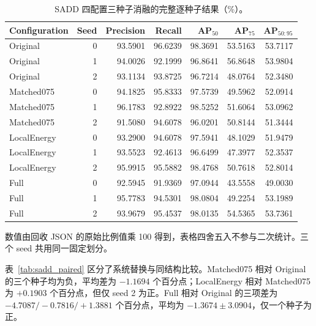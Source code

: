 \documentclass[journal]{IEEEtran}
\begin{document}
\begin{table}[!t]
\centering
\small
\setlength{\tabcolsep}{3pt}
\caption{SADD 四配置三种子消融的完整逐种子结果（\%）。}
\label{tab:sadd_individual}
\begin{tabular*}{\textwidth}{@{\extracolsep{\fill}}lrrrrrr}
\toprule
Configuration & Seed & Precision & Recall & AP$_{50}$ & AP$_{75}$ & AP$_{50:95}$ \\
\midrule
Original & 0 & 93.5901 & 96.6239 & 98.3691 & 53.5163 & 53.7117 \\
Original & 1 & 94.0026 & 92.1999 & 96.8641 & 56.8648 & 53.9804 \\
Original & 2 & 93.1134 & 93.8725 & 96.7214 & 48.0764 & 52.3480 \\
\midrule
Matched075 & 0 & 94.1825 & 95.8333 & 97.5739 & 49.5962 & 52.0914 \\
Matched075 & 1 & 96.1783 & 92.8922 & 98.5252 & 51.6064 & 53.0962 \\
Matched075 & 2 & 91.5080 & 94.6078 & 96.0201 & 50.8144 & 51.3444 \\
\midrule
LocalEnergy & 0 & 93.2900 & 94.6078 & 97.5941 & 48.1029 & 51.9479 \\
LocalEnergy & 1 & 93.5523 & 92.4613 & 96.6499 & 47.3977 & 52.3537 \\
LocalEnergy & 2 & 95.9915 & 95.5882 & 98.4768 & 50.7618 & 52.8014 \\
\midrule
Full & 0 & 92.5945 & 91.9369 & 97.0944 & 43.5558 & 49.0030 \\
Full & 1 & 95.7783 & 94.5301 & 98.0804 & 49.2254 & 53.1989 \\
Full & 2 & 93.9679 & 95.4537 & 98.0135 & 54.5365 & 53.7361 \\
\bottomrule
\end{tabular*}
\smallskip
\begin{minipage}{\linewidth}
\footnotesize
数值由回收 JSON 的原始比例值乘 100 得到，表格四舍五入不参与二次统计。三个 seed 共用同一固定划分。
\end{minipage}
\end{table}

表~\ref{tab:sadd_paired} 区分了系统替换与同结构比较。Matched075 相对 Original 的三个种子均为负，平均差为 $-1.1694$ 个百分点；LocalEnergy 相对 Matched075 为 $+0.1903$ 个百分点，但仅 seed 2 为正。Full 相对 Original 的三项差为 $-4.7087/-0.7816/+1.3881$ 个百分点，平均为 $-1.3674\pm3.0904$，仅一个种子为正。
\end{document}
